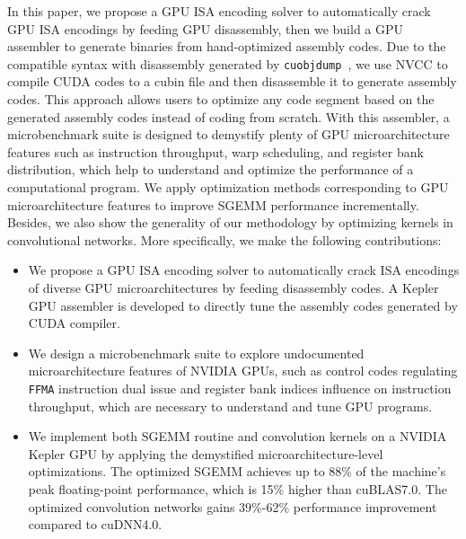 In this paper, we propose a GPU ISA encoding solver to automatically crack GPU ISA encodings by feeding GPU disassembly,
then we build a GPU assembler to generate binaries from hand-optimized assembly codes. %
Due to the compatible syntax with disassembly generated by {\tt cuobjdump}~\cite{cubin2015util}, we use NVCC
to compile CUDA codes to a cubin file and then disassemble it to generate assembly codes.
This approach allows users to optimize any code segment based on the generated assembly codes instead of coding from scratch. 
With this assembler, a microbenchmark suite is designed to 
demystify plenty of GPU microarchitecture features such as instruction
throughput, warp scheduling, and register bank distribution, which help to
understand and optimize the performance of a computational program. 
We apply optimization methods corresponding to GPU microarchitecture features to improve SGEMM performance incrementally. Besides, we also show the generality of our methodology by optimizing kernels in convolutional networks.
More specifically, we make the following contributions:

\begin{itemize}
\item We propose a GPU ISA encoding solver to automatically crack ISA encodings
     of diverse GPU microarchitectures by feeding disassembly codes.
A Kepler GPU assembler is developed to directly tune the assembly codes generated by CUDA compiler.
\item We design a microbenchmark suite to explore undocumented
microarchitecture features of NVIDIA GPUs, such as control codes regulating
{\tt FFMA} instruction dual issue and register bank indices influence on
instruction throughput, which are necessary to understand and tune GPU
programs.
\item We implement both SGEMM routine and convolution kernels on a NVIDIA Kepler GPU by applying the demystified microarchitecture-level optimizations. 
The optimized SGEMM achieves up to 88\% of the machine's peak floating-point performance, which is 15\% higher than cuBLAS7.0. The optimized convolution networks gains $39\%$-$62\%$ performance improvement compared to cuDNN4.0.
\end{itemize}

